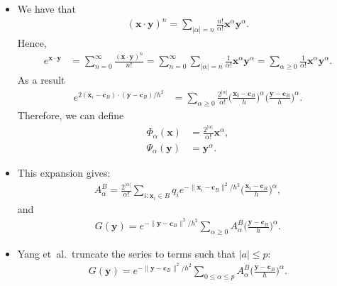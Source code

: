 \documentclass[10pt]{article}
\newcommand{\ve}[1]{\mathbf{#1}}
\newcommand{\etal}{{et~al.}}
\begin{document}
\begin{itemize}
  \item We have that
  \begin{align*}
    (\ve{x} \cdot \ve{y})^n = \sum_{|\alpha|=n} \frac{n!}{\alpha!} \ve{x}^\alpha \ve{y}^\alpha.
  \end{align*}
  Hence,
  \begin{align*}
    e^{\ve{x} \cdot \ve{y}} 
    &= \sum_{n=0}^\infty \frac{(\ve{x} \cdot \ve{y})^n}{n!}
    = \sum_{n=0}^\infty \sum_{|\alpha|=n} \frac{1}{\alpha!} \ve{x}^\alpha \ve{y}^\alpha
    = \sum_{\alpha \geq 0} \frac{1}{\alpha!} \ve{x}^\alpha \ve{y}^\alpha.
  \end{align*}
  As a result
  \begin{align*}
    e^{2(\ve{x}_i - \ve{c}_B) \cdot (\ve{y} - \ve{c}_B)/h^2} 
    &= \sum_{\alpha \geq 0} \frac{2^{|\alpha|}}{\alpha!} \bigg( \frac{\ve{x_i} - \ve{c}_B}{h} \bigg)^\alpha \bigg( \frac{\ve{y} - \ve{c}_B}{h} \bigg)^\alpha.
  \end{align*}
  Therefore, we can define
  \begin{align*}
    \Phi_\alpha(\ve{x}) &= \frac{2^{|\alpha|}}{\alpha!} \ve{x}^\alpha,\\
    \Psi_\alpha(\ve{y}) &= \ve{y}^\alpha.
  \end{align*}
  
  \item This expansion gives:
  \begin{align*}
    A_\alpha^B = \frac{ 2^{|\alpha|} } {\alpha!} \sum_{i:\ve{x}_i \in B} q_i e^{-\| \ve{x}_i - \ve{c}_B \|^2/h^2} \bigg( \frac{\ve{x}_i - \ve{c}_B }{h} \bigg)^\alpha,
  \end{align*}
  and
  \begin{align*}
    G(\ve{y}) = e^{-\| \ve{y} - \ve{c}_B \|^2 / h^2} \sum_{\alpha \geq 0} A_\alpha^B \bigg(\frac{\ve{y} - \ve{c}_B}{h}\bigg)^\alpha.
  \end{align*}
  
  \item Yang \etal\ truncate the series to terms such that $|a| \leq p$:
  \begin{align*}
    G(\ve{y}) = e^{-\| \ve{y} - \ve{c}_B \|^2 / h^2} \sum_{0 \leq \alpha \leq p} A_\alpha^B \bigg(\frac{\ve{y} - \ve{c}_B}{h}\bigg)^\alpha.
  \end{align*}
  
\end{itemize}

  

	
\end{document}

